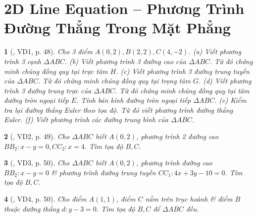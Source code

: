 \documentclass{article}
\newtheorem{baitoan}{}
\begin{document}
%	
%
%	
%
%	


\section{2D Line Equation -- Phương Trình Đường Thẳng Trong Mặt Phẳng}

\begin{baitoan}[\cite{Hai_Hung_Thu_Tung_ncpt_Toan_10_tap_2}, VD1, p. 48]
	Cho 3 điểm $A(0,2),B(2,2),C(4,-2)$. (a) Viết phương trình 3 cạnh $\Delta ABC$. (b) Viết phương trình 3 đường cao của $\Delta ABC$. Từ đó chứng minh chúng đồng quy tại trực tâm $H$. (c) Viết phương trình 3 đường trung tuyến của $\Delta ABC$. Từ đó chứng minh chúng đồng quy tại trọng tâm $G$. (d) Viết phương trình 3 đường trung trực của $\Delta ABC$. Từ đó chứng minh chúng đồng quy tại tâm đường tròn ngoại tiếp $E$. Tính bán kính đường tròn ngoại tiếp $\Delta ABC$. (e) Kiểm tra lại đường thẳng Euler theo tọa độ. Từ đó viết phương trình đường thẳng Euler. (f) Viết phương trình các đường trung bình của $\Delta ABC$.
\end{baitoan}

\begin{baitoan}[\cite{Hai_Hung_Thu_Tung_ncpt_Toan_10_tap_2}, VD2, p. 49]
	Cho $\Delta ABC$ biết $A(0,2)$, phương trình 2 đường cao $BB_2:x - y = 0,CC_2: x = 4$. Tìm tọa độ $B,C$.
\end{baitoan}

\begin{baitoan}[\cite{Hai_Hung_Thu_Tung_ncpt_Toan_10_tap_2}, VD3, p. 50]
	Cho $\Delta ABC$ biết $A(0,2)$, phương trình đường cao $BB_2:x - y = 0$ \& phương trình đường trung tuyến $CC_1:4x + 3y - 10 = 0$. Tìm tọa độ $B,C$.
\end{baitoan}

\begin{baitoan}[\cite{Hai_Hung_Thu_Tung_ncpt_Toan_10_tap_2}, VD4, p. 50]
	Cho điểm $A(1,1)$, điểm $C$ nằm trên trục hoành \& điểm $B$ thuộc đường thẳng $d:y - 3 = 0$. Tìm tọa độ $B,C$ để $\Delta ABC$ đều.
\end{baitoan}
\end{document}
